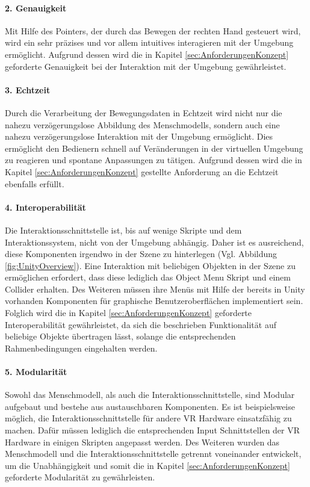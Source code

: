 \paragraph{2. Genauigkeit}
\noindent Mit Hilfe des Pointers, der durch das Bewegen der rechten Hand gesteuert wird, wird ein sehr präzises und vor allem intuitives interagieren mit der Umgebung ermöglicht. Aufgrund dessen wird die in Kapitel \ref{sec:AnforderungenKonzept} geforderte Genauigkeit bei der Interaktion mit der Umgebung gewährleistet.
	
\paragraph{3. Echtzeit}
\noindent Durch die Verarbeitung der Bewegungsdaten in Echtzeit wird nicht nur die nahezu verzögerungslose Abbildung des Menschmodells, sondern auch eine nahezu verzögerungslose Interaktion mit der Umgebung ermöglicht. Dies ermöglicht den Bedienern schnell auf Veränderungen in der virtuellen Umgebung zu reagieren und spontane Anpassungen zu tätigen. Aufgrund dessen wird die in Kapitel \ref{sec:AnforderungenKonzept} gestellte Anforderung an die Echtzeit ebenfalls erfüllt.
	
\paragraph{4. Interoperabilität}
\noindent Die Interaktionsschnittstelle ist, bis auf wenige Skripte und dem Interaktionssystem, nicht von der Umgebung abhängig. Daher ist es ausreichend, diese Komponenten irgendwo in der Szene zu hinterlegen (Vgl. Abbildung \ref{fig:UnityOverview}). Eine Interaktion mit beliebigen Objekten in der Szene zu ermöglichen erfordert, dass diese lediglich das Object Menu Skript und einem Collider erhalten. Des Weiteren müssen ihre Menüs mit Hilfe der bereits in Unity vorhanden Komponenten für graphische Benutzeroberflächen implementiert sein. Folglich wird die in Kapitel \ref{sec:AnforderungenKonzept} geforderte Interoperabilität gewährleistet, da sich die beschrieben Funktionalität auf beliebige Objekte übertragen lässt, solange die entsprechenden Rahmenbedingungen eingehalten werden.
	
\paragraph{5. Modularität}
\noindent Sowohl das Menschmodell, als auch die Interaktionsschnittstelle, sind Modular aufgebaut und bestehe aus austauschbaren Komponenten. Es ist beispielsweise möglich, die Interaktionsschnittstelle für andere VR Hardware einsatzfähig zu machen. Dafür müssen lediglich die entsprechenden Input Schnittstellen der VR Hardware in einigen Skripten angepasst werden. Des Weiteren wurden das Menschmodell und die Interaktionsschnittstelle getrennt voneinander entwickelt, um die Unabhängigkeit und somit die in Kapitel \ref{sec:AnforderungenKonzept} geforderte Modularität zu gewährleisten.

